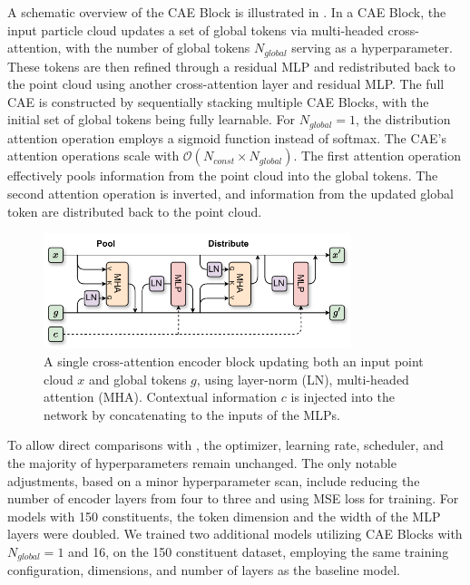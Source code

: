 A schematic overview of the CAE Block is illustrated in .
In a CAE Block, the input particle cloud updates a set of global tokens via multi-headed cross-attention, with the number of global tokens $N_{global}$ serving as a hyperparameter.
These tokens are then refined through a residual MLP and redistributed back to the point cloud using another cross-attention layer and residual MLP.
The full CAE is constructed by sequentially stacking multiple CAE Blocks, with the initial set of global tokens being fully learnable.
For $N_{global}=1$, the distribution attention operation employs a sigmoid function instead of softmax.
The CAE's attention operations scale with $\mathcal{O}(N_{const} \times N_{global})$.
The first attention operation effectively pools information from the point cloud into the global tokens. The second attention operation is inverted, and information from the updated global token are distributed back to the point cloud.

\begin{figure}[htpb]
    \centering
    \includegraphics[width=0.8\textwidth]{Figures/jet_generation/CAEB.pdf}
    \caption{A single cross-attention encoder block updating both an input point cloud $x$ and global tokens $g$, using layer-norm (LN), multi-headed attention (MHA). Contextual information $c$ is injected into the network by concatenating to the inputs of the MLPs.}
    \label{fig:cae_network}
\end{figure}

To allow direct comparisons with \pcjedi, the optimizer, learning rate, scheduler, and the majority of hyperparameters remain unchanged.
The only notable adjustments, based on a minor hyperparameter scan, include reducing the number of encoder layers from four to three and using MSE loss for training.
For models with 150 constituents, the token dimension and the width of the MLP layers were doubled.
We trained two additional models utilizing CAE Blocks with $N_{global}=1$ and 16, on the 150 constituent dataset, employing the same training configuration, dimensions, and number of layers as the baseline model.

